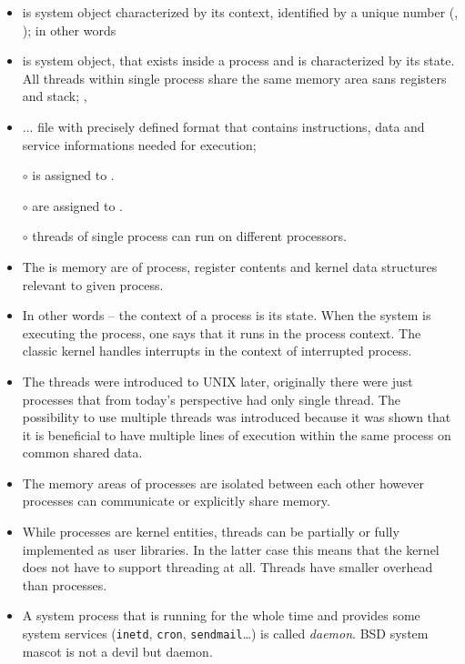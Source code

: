 \begin{slide}
\begin{itemize}
\item {} is system object characterized by its context,
identified by a unique number (,
); in other words  
\item {} is system object, that exists inside a process and
is characterized by its state. All threads within single process share
the same memory area sans registers and stack; ,
\item {} ... file with precisely defined format that contains
instructions, data and service informations needed for execution;
\end{itemize}

\begin{itemize}
\item[$\circ$]  is assigned to . 
\item[$\circ$]  are assigned to .
\item[$\circ$] threads of single process can run on different processors.
\end{itemize}
\end{slide}

\begin{itemize}
\item The  is memory are of process, register contents and
kernel data structures relevant to given process.
\item In other words -- the context of a process is its state. When the system
is executing the process, one says that it runs in the process context.
The classic kernel handles interrupts in the context of interrupted process.
\item The threads were introduced to UNIX later, originally there were just
processes that from today's perspective had only single thread. The possibility
to use multiple threads was introduced because it was shown that it is
beneficial to have multiple lines of execution within the same process on
common shared data.
\item The memory areas of processes are isolated between each other however
processes can communicate or explicitly share memory.
\item While processes are kernel entities, threads can be partially or fully
implemented as user libraries. In the latter case this means that the kernel
does not have to support threading at all. Threads have smaller overhead than
processes.
\item A system process that is running for the whole time and provides some
system services (\texttt{inetd}, \texttt{cron}, \texttt{sendmail}\dots) is
called \emph{daemon}. BSD system mascot is not a devil but daemon.
\end{itemize}

